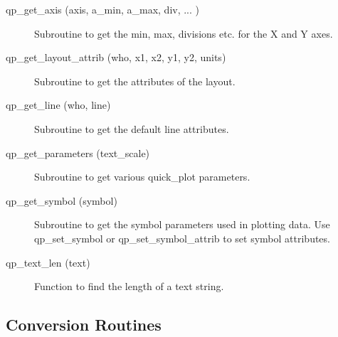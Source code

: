 \begin{description}

\label{r:qp.get.axis}
\item[qp_get_axis (axis, a_min, a_max, div, ... )] \Newline
     Subroutine to get the min, max, divisions etc. for the X and Y axes.

\label{r:qp.get.layout.attrib}
\item[qp_get_layout_attrib (who, x1, x2, y1, y2, units)] \Newline 
     Subroutine to get the attributes of the layout.

\label{r:qp.get.line}
\item[qp_get_line (who, line)] \Newline 
Subroutine to get the default line attributes.

\label{r:qp.get.parameters}
\item[qp_get_parameters (text_scale)] \Newline 
Subroutine to get various quick_plot parameters.

\label{r:qp.get.symbol}
\item[qp_get_symbol (symbol)] \Newline 
Subroutine to get the symbol parameters used in plotting data.
Use qp_set_symbol or qp_set_symbol_attrib to set symbol attributes.

\label{r:qp.text.len}
\item[qp_text_len (text)] \Newline 
     Function to find the length of a text string.

\end{description}

\subsection{Conversion Routines}

